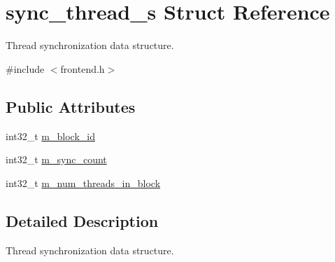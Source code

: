 \hypertarget{structsync__thread__s}{
\section{sync\_\-thread\_\-s Struct Reference}
\label{structsync__thread__s}
}


Thread synchronization data structure.  




{\ttfamily \#include $<$frontend.h$>$}

\subsection*{Public Attributes}
\begin{DoxyCompactItemize}
\item 
int32\_\-t \hyperlink{structsync__thread__s_a8ea89f50640cc2dc347b2300718af6a8}{m\_\-block\_\-id}
\item 
int32\_\-t \hyperlink{structsync__thread__s_a4ea69c583bd2a360fc81d0ef5484cf8c}{m\_\-sync\_\-count}
\item 
int32\_\-t \hyperlink{structsync__thread__s_a99f9d07e88d9a317cbeaea352765c10e}{m\_\-num\_\-threads\_\-in\_\-block}
\end{DoxyCompactItemize}


\subsection{Detailed Description}
Thread synchronization data structure. 

